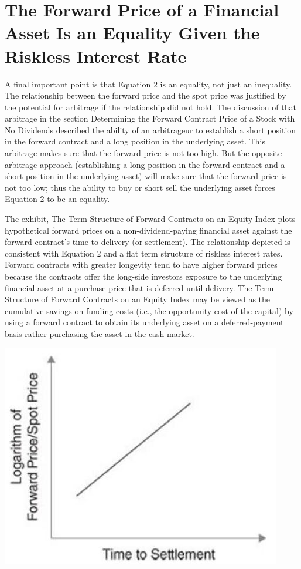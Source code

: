 \documentclass[11pt]{article}
\begin{document}
\section*{The Forward Price of a Financial Asset Is an Equality Given the Riskless Interest Rate}
A final important point is that Equation 2 is an equality, not just an inequality. The relationship between the forward price and the spot price was justified by the potential for arbitrage if the relationship did not hold. The discussion of that arbitrage in the section Determining the Forward Contract Price of a Stock with No Dividends described the ability of an arbitrageur to establish a short position in the forward contract and a long position in the underlying asset. This arbitrage makes sure that the forward price is not too high. But the opposite arbitrage approach (establishing a long position in the forward contract and a short position in the underlying asset) will make sure that the forward price is not too low; thus the ability to buy or short sell the underlying asset forces Equation 2 to be an equality.

The exhibit, The Term Structure of Forward Contracts on an Equity Index plots hypothetical forward prices on a non-dividend-paying financial asset against the forward contract's time to delivery (or settlement). The relationship depicted is consistent with Equation 2 and a flat term structure of riskless interest rates. Forward contracts with greater longevity tend to have higher forward prices because the contracts offer the long-side investors exposure to the underlying financial asset at a purchase price that is deferred until delivery. The Term Structure of Forward Contracts on an Equity Index may be viewed as the cumulative savings on funding costs (i.e., the opportunity cost of the capital) by using a forward contract to obtain its underlying asset on a deferred-payment basis rather purchasing the asset in the cash market.

\begin{center}
\includegraphics[max width=\textwidth]{2024_04_10_26637806882eb3fbfa51g-03}
\end{center}
\end{document}
